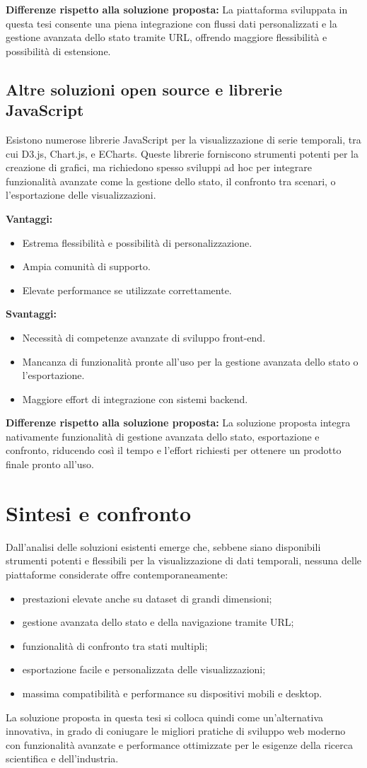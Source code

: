 \textbf{Differenze rispetto alla soluzione proposta:}
La piattaforma sviluppata in questa tesi consente una piena integrazione con flussi dati personalizzati e la gestione avanzata dello stato tramite URL, offrendo maggiore flessibilità e possibilità di estensione.

\subsection{Altre soluzioni open source e librerie JavaScript}

Esistono numerose librerie JavaScript per la visualizzazione di serie temporali, tra cui D3.js, Chart.js, e ECharts. Queste librerie forniscono strumenti potenti per la creazione di grafici, ma richiedono spesso sviluppi ad hoc per integrare funzionalità avanzate come la gestione dello stato, il confronto tra scenari, o l’esportazione delle visualizzazioni.

\textbf{Vantaggi:}
\begin{itemize}
    \item Estrema flessibilità e possibilità di personalizzazione.
    \item Ampia comunità di supporto.
    \item Elevate performance se utilizzate correttamente.
\end{itemize}

\textbf{Svantaggi:}
\begin{itemize}
    \item Necessità di competenze avanzate di sviluppo front-end.
    \item Mancanza di funzionalità pronte all’uso per la gestione avanzata dello stato o l’esportazione.
    \item Maggiore effort di integrazione con sistemi backend.
\end{itemize}

\textbf{Differenze rispetto alla soluzione proposta:}
La soluzione proposta integra nativamente funzionalità di gestione avanzata dello stato, esportazione e confronto, riducendo così il tempo e l’effort richiesti per ottenere un prodotto finale pronto all’uso.

\section{Sintesi e confronto}

Dall’analisi delle soluzioni esistenti emerge che, sebbene siano disponibili strumenti potenti e flessibili per la visualizzazione di dati temporali, nessuna delle piattaforme considerate offre contemporaneamente:
\begin{itemize}
    \item prestazioni elevate anche su dataset di grandi dimensioni;
    \item gestione avanzata dello stato e della navigazione tramite URL;
    \item funzionalità di confronto tra stati multipli;
    \item esportazione facile e personalizzata delle visualizzazioni;
    \item massima compatibilità e performance su dispositivi mobili e desktop.
\end{itemize}

La soluzione proposta in questa tesi si colloca quindi come un’alternativa innovativa, in grado di coniugare le migliori pratiche di sviluppo web moderno con funzionalità avanzate e performance ottimizzate per le esigenze della ricerca scientifica e dell’industria.
